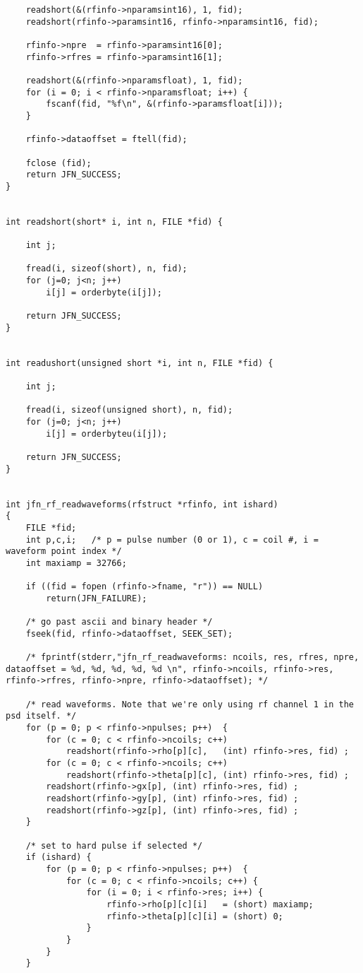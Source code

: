 \begin{lstlisting}
	readshort(&(rfinfo->nparamsint16), 1, fid);
	readshort(rfinfo->paramsint16, rfinfo->nparamsint16, fid);

	rfinfo->npre  = rfinfo->paramsint16[0];
	rfinfo->rfres = rfinfo->paramsint16[1];

	readshort(&(rfinfo->nparamsfloat), 1, fid);
	for (i = 0; i < rfinfo->nparamsfloat; i++) {
		fscanf(fid, "%f\n", &(rfinfo->paramsfloat[i]));
	}

	rfinfo->dataoffset = ftell(fid);
  
	fclose (fid);
	return JFN_SUCCESS;
}


int readshort(short* i, int n, FILE *fid) {

	int j;

	fread(i, sizeof(short), n, fid);
	for (j=0; j<n; j++)
		i[j] = orderbyte(i[j]);

	return JFN_SUCCESS;
}


int readushort(unsigned short *i, int n, FILE *fid) {

	int j;

	fread(i, sizeof(unsigned short), n, fid);
	for (j=0; j<n; j++)
		i[j] = orderbyteu(i[j]);

	return JFN_SUCCESS;
}


int jfn_rf_readwaveforms(rfstruct *rfinfo, int ishard)
{
	FILE *fid;
	int p,c,i;   /* p = pulse number (0 or 1), c = coil #, i = waveform point index */
	int maxiamp = 32766;

	if ((fid = fopen (rfinfo->fname, "r")) == NULL)
		return(JFN_FAILURE);

	/* go past ascii and binary header */
	fseek(fid, rfinfo->dataoffset, SEEK_SET);

	/* fprintf(stderr,"jfn_rf_readwaveforms: ncoils, res, rfres, npre, dataoffset = %d, %d, %d, %d, %d \n", rfinfo->ncoils, rfinfo->res, rfinfo->rfres, rfinfo->npre, rfinfo->dataoffset); */

	/* read waveforms. Note that we're only using rf channel 1 in the psd itself. */
	for (p = 0; p < rfinfo->npulses; p++)  {
		for (c = 0; c < rfinfo->ncoils; c++) 
			readshort(rfinfo->rho[p][c],   (int) rfinfo->res, fid) ;
		for (c = 0; c < rfinfo->ncoils; c++) 
			readshort(rfinfo->theta[p][c], (int) rfinfo->res, fid) ;
		readshort(rfinfo->gx[p], (int) rfinfo->res, fid) ;
		readshort(rfinfo->gy[p], (int) rfinfo->res, fid) ;
		readshort(rfinfo->gz[p], (int) rfinfo->res, fid) ;
	}

	/* set to hard pulse if selected */
	if (ishard) {
		for (p = 0; p < rfinfo->npulses; p++)  {
			for (c = 0; c < rfinfo->ncoils; c++) {
				for (i = 0; i < rfinfo->res; i++) {
					rfinfo->rho[p][c][i]   = (short) maxiamp;
					rfinfo->theta[p][c][i] = (short) 0;
				}
			}
		}
	}


\end{lstlisting}
